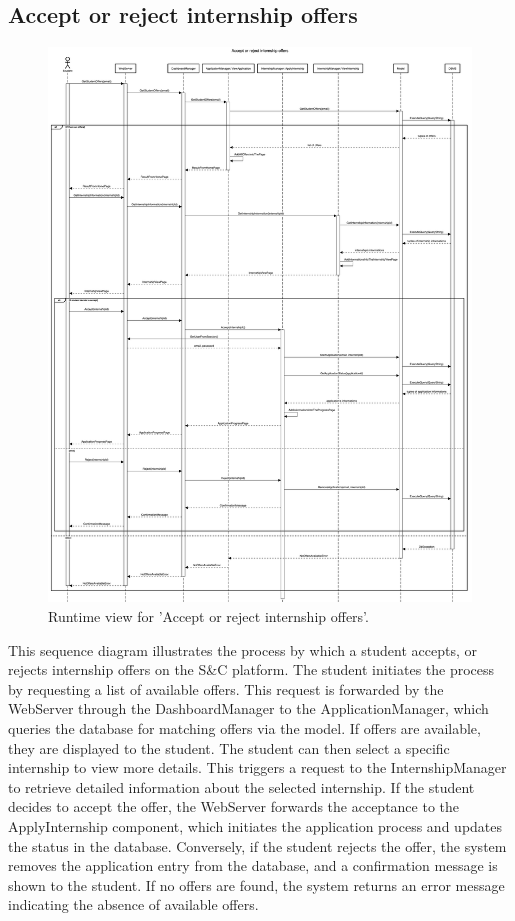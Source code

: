 \subsection{Accept or reject internship offers}
\begin{figure}[H]
    \begin{center}
        \includegraphics[width=0.8\linewidth]{DD/LaTeX/Images/RuntimeView/EvaluationInternshipOffers.png}
        \caption{Runtime view for 'Accept or reject internship offers'.}
        \label{fig:runtime_EvaluationInternshipOffers}%
    \end{center}
\end{figure}

This sequence diagram illustrates the process by which a student accepts, or rejects internship offers on the S\&C platform. The student initiates the process by requesting a list of available offers. This request is forwarded by the WebServer through the DashboardManager to the ApplicationManager, which queries the database for matching offers via the model. If offers are available, they are displayed to the student. The student can then select a specific internship to view more details. This triggers a request to the InternshipManager to retrieve detailed information about the selected internship. If the student decides to accept the offer, the WebServer forwards the acceptance to the ApplyInternship component, which initiates the application process and updates the status in the database. Conversely, if the student rejects the offer, the system removes the application entry from the database, and a confirmation message is shown to the student. If no offers are found, the system returns an error message indicating the absence of available offers.

